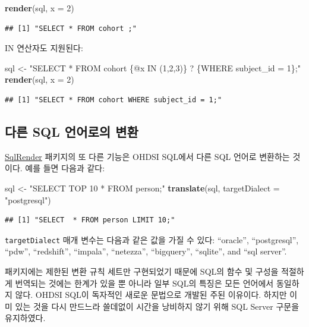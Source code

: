 \documentclass[11pt]{book}
\newenvironment{Shaded}{\begin{snugshade}}{\end{snugshade}}
\newcommand{\KeywordTok}[1]{\textcolor[rgb]{0.13,0.29,0.53}{\textbf{#1}}}
\newcommand{\DataTypeTok}[1]{\textcolor[rgb]{0.13,0.29,0.53}{#1}}
\newcommand{\DecValTok}[1]{\textcolor[rgb]{0.00,0.00,0.81}{#1}}
\newcommand{\StringTok}[1]{\textcolor[rgb]{0.31,0.60,0.02}{#1}}
\newcommand{\NormalTok}[1]{#1}
\theoremstyle{definition}
\theoremstyle{definition}
\theoremstyle{definition}
\theoremstyle{remark}
\let\BeginKnitrBlock\begin \let\EndKnitrBlock\end
\begin{document}
\begin{Shaded}
\begin{Highlighting}[]
\KeywordTok{render}\NormalTok{(sql, }\DataTypeTok{x =} \DecValTok{2}\NormalTok{)}
\end{Highlighting}
\end{Shaded}

\begin{verbatim}
## [1] "SELECT * FROM cohort ;"
\end{verbatim}

IN 연산자도 지원된다:

\begin{Shaded}
\begin{Highlighting}[]
\NormalTok{sql <-}\StringTok{ "SELECT * FROM cohort \{@x IN (1,2,3)\} ? \{WHERE subject_id = 1\};"}
\KeywordTok{render}\NormalTok{(sql, }\DataTypeTok{x =} \DecValTok{2}\NormalTok{)}
\end{Highlighting}
\end{Shaded}

\begin{verbatim}
## [1] "SELECT * FROM cohort WHERE subject_id = 1;"
\end{verbatim}

\subsection{다른 SQL 언어로의 변환}\label{-sql--}

\href{https://ohdsi.github.io/SqlRender/}{SqlRender} 패키지의 또 다른
기능은 OHDSI SQL에서 다른 SQL 언어로 변환하는 것이다. 예를 들면 다음과
같다:

\begin{Shaded}
\begin{Highlighting}[]
\NormalTok{sql <-}\StringTok{ "SELECT TOP 10 * FROM person;"}
\KeywordTok{translate}\NormalTok{(sql, }\DataTypeTok{targetDialect =} \StringTok{"postgresql"}\NormalTok{)}
\end{Highlighting}
\end{Shaded}

\begin{verbatim}
## [1] "SELECT  * FROM person LIMIT 10;"
\end{verbatim}

\texttt{targetDialect} 매개 변수는 다음과 같은 값을 가질 수 있다:
``oracle'', ``postgresql'', ``pdw'', ``redshift'', ``impala'',
``netezza'', ``bigquery'', ``sqlite'', and ``sql server''.

\BeginKnitrBlock{rmdimportant}
패키지에는 제한된 변환 규칙 세트만 구현되었기 때문에 SQL의 함수 및
구성을 적절하게 번역되는 것에는 한계가 있을 뿐 아니라 일부 SQL의 특징은
모든 언어에서 동일하지 않다. OHDSI SQL이 독자적인 새로운 문법으로 개발된
주된 이유이다. 하지만 이미 있는 것을 다시 만드느라 쓸데없이 시간을
낭비하지 않기 위해 SQL Server 구문을 유지하였다.
\EndKnitrBlock{rmdimportant}
\end{document}

